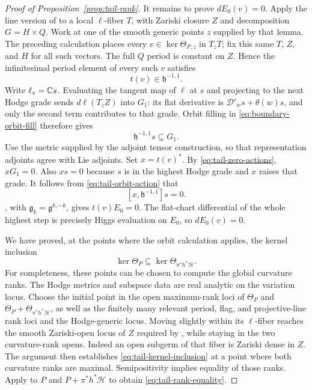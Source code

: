 \begin{proof}[Proof of Proposition~\ref{prop:tail-rank}]
It remains to prove $dE_0(v)=0$.  Apply the line
version of  to a local
$\ell$-fiber $T$, with Zariski closure $Z$ and
decomposition $G=H\times Q$.  Work at one of the
smooth generic points $z$ supplied by that lemma.
The preceding calculation places every
$v\in\ker\Theta_{P,z}$ in $T_zT$; fix this same
$T$, $Z$, and $H$ for all such vectors.  The full
$Q$ period is constant on $Z$.  Hence the
infinitesimal period element of every such $v$ satisfies
\[
                    t(v)\in\mathfrak h^{-1,1}.
\]
Write $\ell_z=\mathbb C s$.  Evaluating the tangent map
of $\ell$ at $s$ and projecting to the next Hodge
grade sends $d\ell(T_zZ)$ into $G_1$: its flat
derivative is $\mathcal D'_w s+\theta(w)s$, and
only the second term contributes to that grade.
Orbit filling in \eqref{eq:boundary-orbit-fill}
therefore gives
\begin{equation}\label{eq:tail-orbit-action}
                         \mathfrak h^{-1,1}s\subseteq G_1.
\end{equation}
Use the metric supplied by the adjoint tensor
construction, so that representation adjoints
agree with Lie adjoints.  Set $x=t(v)^*$.
By \eqref{eq:tail-zero-actions},
$xG_1=0$.  Also $xs=0$ because $s$ is in the
highest Hodge grade and $x$ raises that grade.
It follows from \eqref{eq:tail-orbit-action} that
\[
                         [x,\mathfrak h^{-1,1}]s=0.
\]
, with
$\mathfrak g_k=\mathfrak g^{k,-k}$, gives
$t(v)E_0=0$.  The flat-chart differential of the
whole highest step is precisely Higgs evaluation
on $E_0$, so $dE_0(v)=0$.

We have proved, at the points where the orbit
calculation applies, the kernel inclusion
\begin{equation}\label{eq:tail-kernel-inclusion}
                  \ker\Theta_P\subseteq
                          \ker\Theta_{\pi^*h^*\mathcal H}.
\end{equation}
For completeness, these points can be chosen to
compute the global curvature ranks.  The Hodge
metrics and subspace data are real analytic on
the variation locus.  Choose the initial point
in the open maximum-rank loci of $\Theta_P$ and
$\Theta_P+\Theta_{\pi^*h^*\mathcal H}$, as well
as the finitely many relevant period, flag, and
projective-line rank loci and the Hodge-generic locus.  Moving
slightly within its $\ell$-fiber reaches the
smooth Zariski-open locus of $Z$ required by
, while staying in the two
curvature-rank opens.  Indeed an open subgerm of
that fiber is Zariski dense in $Z$.  The argument
then establishes \eqref{eq:tail-kernel-inclusion}
at a point where both curvature ranks are
maximal.  Semipositivity implies equality of
those ranks.  Apply  to
$P$ and $P+\pi^*h^*\mathcal H$ to obtain
\eqref{eq:tail-rank-equality}.
\end{proof}

